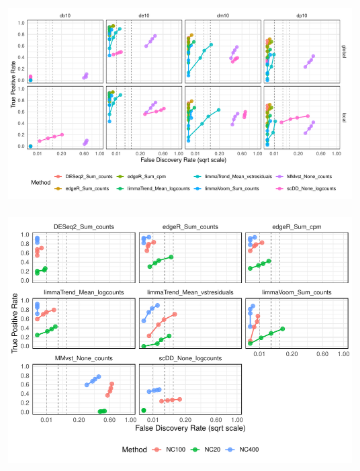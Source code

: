 \documentclass[a4paper, 11pt, twocolumn]{article}
\begin{document}
\begin{figure}[h]
	\centering
	\begin{subfigure}[t]{0.9\textwidth}
		\centering
		\includegraphics[width=\textwidth]{figs/fdrtpr_prop_method_Testis.pdf}
		\caption{}
		\label{fig:fdrtpr_prop_testis}
	\end{subfigure}
	
	\vspace{1em}
	
	\begin{subfigure}[t]{0.8\textwidth}
		\centering
		\includegraphics[width=\textwidth]{figs/fdrtpr_size_method_Testis.pdf}
		\caption{}
		\label{fig:fdrtpr_testis}
	\end{subfigure}
	

\end{figure}
\end{document}
